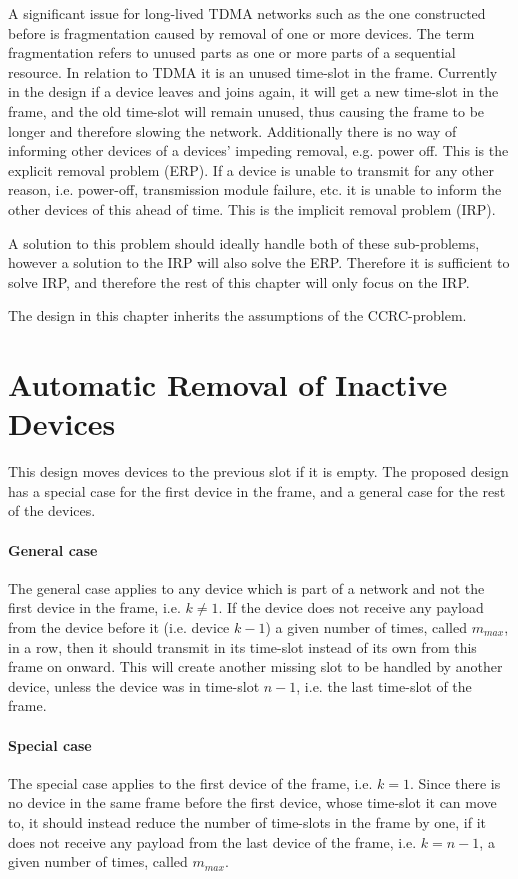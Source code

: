 A significant issue for long-lived TDMA networks such as the one constructed before is fragmentation caused by removal of one or more devices. 
The term fragmentation refers to unused parts as one or more parts of a sequential resource. 
In relation to TDMA it is an unused time-slot in the frame. 
Currently in the design if a device leaves and joins again, it will get a new time-slot in the frame, and the old time-slot will remain unused, thus causing the frame to be longer and therefore slowing the network.
Additionally there is no way of informing other devices of a devices' impeding removal, e.g. power off. 
This is the explicit removal problem (ERP). 
If a device is unable to transmit for any other reason, i.e. power-off, transmission module failure, etc. it is unable to inform the other devices of this ahead of time. 
This is the implicit removal problem (IRP). 

A solution to this problem should ideally handle both of these sub-problems, however a solution to the IRP will also solve the ERP.
Therefore it is sufficient to solve IRP, and therefore the rest of this chapter will only focus on the IRP.  

The design in this chapter inherits the assumptions of the CCRC-problem. 

\section{Automatic Removal of Inactive Devices}
This design moves devices to the previous slot if it is empty. 
The proposed design has a special case for the first device in the frame, and a general case for the rest of the devices.

\paragraph{General case}
The general case applies to any device which is part of a network and not the first device in the frame, i.e. $k \neq 1$.
If the device does not receive any payload from the device before it (i.e. device $k - 1$) a given number of times, called $m_{max}$, in a row, then it should transmit in its time-slot instead of its own from this frame on onward. 
This will create another missing slot to be handled by another device, unless the device was in time-slot $n - 1$, i.e. the last time-slot of the frame. 

\paragraph{Special case}
The special case applies to the first device of the frame, i.e. $k = 1$. 
Since there is no device in the same frame before the first device, whose time-slot it can move to, it should instead reduce the number of time-slots in the frame by one, if it does not receive any payload from the last device of the frame, i.e. $k = n - 1$, a given number of times, called $m_{max}$. 

